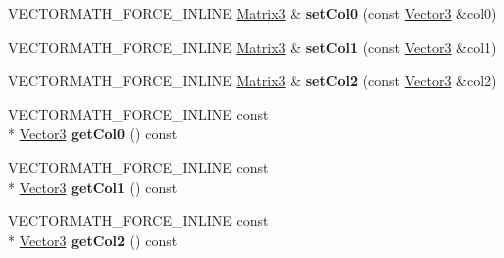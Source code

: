 \begin{DoxyCompactItemize}
\item 
\hypertarget{class_vectormath_1_1_aos_1_1_matrix3_a8f8fd6b2d5206c0e8f0a245ad9c81a20}{V\+E\+C\+T\+O\+R\+M\+A\+T\+H\+\_\+\+F\+O\+R\+C\+E\+\_\+\+I\+N\+L\+I\+N\+E \hyperlink{class_vectormath_1_1_aos_1_1_matrix3}{Matrix3} \& {\bfseries set\+Col0} (const \hyperlink{class_vectormath_1_1_aos_1_1_vector3}{Vector3} \&col0)}\label{class_vectormath_1_1_aos_1_1_matrix3_a8f8fd6b2d5206c0e8f0a245ad9c81a20}

\item 
\hypertarget{class_vectormath_1_1_aos_1_1_matrix3_a456edc290d244d17dcddd23e241e9acd}{V\+E\+C\+T\+O\+R\+M\+A\+T\+H\+\_\+\+F\+O\+R\+C\+E\+\_\+\+I\+N\+L\+I\+N\+E \hyperlink{class_vectormath_1_1_aos_1_1_matrix3}{Matrix3} \& {\bfseries set\+Col1} (const \hyperlink{class_vectormath_1_1_aos_1_1_vector3}{Vector3} \&col1)}\label{class_vectormath_1_1_aos_1_1_matrix3_a456edc290d244d17dcddd23e241e9acd}

\item 
\hypertarget{class_vectormath_1_1_aos_1_1_matrix3_ad821271f4f936c43be5d41c1ab7f480f}{V\+E\+C\+T\+O\+R\+M\+A\+T\+H\+\_\+\+F\+O\+R\+C\+E\+\_\+\+I\+N\+L\+I\+N\+E \hyperlink{class_vectormath_1_1_aos_1_1_matrix3}{Matrix3} \& {\bfseries set\+Col2} (const \hyperlink{class_vectormath_1_1_aos_1_1_vector3}{Vector3} \&col2)}\label{class_vectormath_1_1_aos_1_1_matrix3_ad821271f4f936c43be5d41c1ab7f480f}

\item 
\hypertarget{class_vectormath_1_1_aos_1_1_matrix3_a0e88b3c0752819713064ff8b54435d71}{V\+E\+C\+T\+O\+R\+M\+A\+T\+H\+\_\+\+F\+O\+R\+C\+E\+\_\+\+I\+N\+L\+I\+N\+E const \\*
\hyperlink{class_vectormath_1_1_aos_1_1_vector3}{Vector3} {\bfseries get\+Col0} () const }\label{class_vectormath_1_1_aos_1_1_matrix3_a0e88b3c0752819713064ff8b54435d71}

\item 
\hypertarget{class_vectormath_1_1_aos_1_1_matrix3_ab1fe076cf7b7817b91626d6df307c7ca}{V\+E\+C\+T\+O\+R\+M\+A\+T\+H\+\_\+\+F\+O\+R\+C\+E\+\_\+\+I\+N\+L\+I\+N\+E const \\*
\hyperlink{class_vectormath_1_1_aos_1_1_vector3}{Vector3} {\bfseries get\+Col1} () const }\label{class_vectormath_1_1_aos_1_1_matrix3_ab1fe076cf7b7817b91626d6df307c7ca}

\item 
\hypertarget{class_vectormath_1_1_aos_1_1_matrix3_a36cc4def9faa765a368c41a5f5af2685}{V\+E\+C\+T\+O\+R\+M\+A\+T\+H\+\_\+\+F\+O\+R\+C\+E\+\_\+\+I\+N\+L\+I\+N\+E const \\*
\hyperlink{class_vectormath_1_1_aos_1_1_vector3}{Vector3} {\bfseries get\+Col2} () const }\label{class_vectormath_1_1_aos_1_1_matrix3_a36cc4def9faa765a368c41a5f5af2685}


\end{DoxyCompactItemize}
